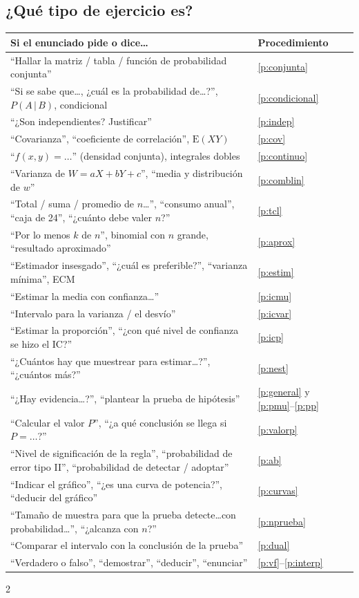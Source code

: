 \documentclass[11pt,a4paper]{article}
\newcommand{\E}{\mathrm{E}}
\begin{document}
\subsection*{¿Qué tipo de ejercicio es?}
\begin{center}
\small
\renewcommand{\arraystretch}{1.18}
\begin{tabular}{@{}>{\raggedright\arraybackslash}p{10.6cm}l@{}}
\toprule
Si el enunciado pide o dice\ldots & Procedimiento\\\midrule
``Hallar la matriz / tabla / función de probabilidad conjunta'' & \ref{p:conjunta}\\
``Si se sabe que\ldots, ¿cuál es la probabilidad de\ldots?'', $P(A\,|\,B)$, condicional & \ref{p:condicional}\\
``¿Son independientes? Justificar'' & \ref{p:indep}\\
``Covarianza'', ``coeficiente de correlación'', $\E(XY)$ & \ref{p:cov}\\
``$f(x,y)=\dots$'' (densidad conjunta), integrales dobles & \ref{p:continuo}\\
``Varianza de $W=aX+bY+c$'', ``media y distribución de $w$'' & \ref{p:comblin}\\
``Total / suma / promedio de $n$\ldots'', ``consumo anual'', ``caja de 24'', ``¿cuánto debe valer $n$?'' & \ref{p:tcl}\\
``Por lo menos $k$ de $n$'', binomial con $n$ grande, ``resultado aproximado'' & \ref{p:aprox}\\
``Estimador insesgado'', ``¿cuál es preferible?'', ``varianza mínima'', ECM & \ref{p:estim}\\
``Estimar la media con confianza\ldots'' & \ref{p:icmu}\\
``Intervalo para la varianza / el desvío'' & \ref{p:icvar}\\
``Estimar la proporción'', ``¿con qué nivel de confianza se hizo el IC?'' & \ref{p:icp}\\
``¿Cuántos hay que muestrear para estimar\ldots?'', ``¿cuántos más?'' & \ref{p:nest}\\
``¿Hay evidencia\ldots?'', ``plantear la prueba de hipótesis'' & \ref{p:general} y \ref{p:pmu}--\ref{p:pp}\\
``Calcular el valor $P$'', ``¿a qué conclusión se llega si $P=\dots$?'' & \ref{p:valorp}\\
``Nivel de significación de la regla'', ``probabilidad de error tipo II'', ``probabilidad de detectar / adoptar'' & \ref{p:ab}\\
``Indicar el gráfico'', ``¿es una curva de potencia?'', ``deducir del gráfico'' & \ref{p:curvas}\\
``Tamaño de muestra para que la prueba detecte\ldots con probabilidad\ldots'', ``¿alcanza con $n$?'' & \ref{p:nprueba}\\
``Comparar el intervalo con la conclusión de la prueba'' & \ref{p:dual}\\
``Verdadero o falso'', ``demostrar'', ``deducir'', ``enunciar'' & \ref{p:vf}--\ref{p:interp}\\
\bottomrule
\end{tabular}
\end{center}

\newpage
{\small\setcounter{tocdepth}{2}
\begin{multicols}{2}
\tableofcontents
\end{multicols}}







\end{document}

